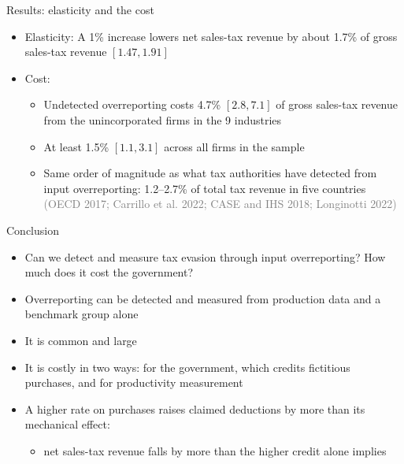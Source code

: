 \documentclass[
  ignorenonframetext,
  aspectratio=169,
]{beamer}
\providecommand{\tightlist}{%
  \setlength{\itemsep}{0pt}\setlength{\parskip}{0pt}}
\newcommand{\sm}[1]{\textcolor{gray}{\footnotesize #1}} %
\begin{document}
\begin{frame}{Results: elasticity and the cost}
\protect{}\label{results-elasticity-and-the-cost}
\begin{itemize}
\tightlist
\item
  Elasticity: A 1\% increase lowers net sales-tax revenue by about 1.7\%
  of gross sales-tax revenue \([1.47, 1.91]\)
\item
  Cost:

  \begin{itemize}
  \tightlist
  \item
    Undetected overreporting costs 4.7\% \([2.8, 7.1]\) of gross
    sales-tax revenue from the unincorporated firms in the 9 industries
  \item
    At least 1.5\% \([1.1, 3.1]\) across all firms in the sample
  \item
    Same order of magnitude as what tax authorities have detected from
    input overreporting: 1.2--2.7\% of total tax revenue in five
    countries \sm{(OECD 2017; Carrillo et al. 2022; CASE and IHS 2018;
    Longinotti 2022)}
  \end{itemize}
\end{itemize}
\end{frame}

\begin{frame}{Conclusion}
\protect{}\label{conclusion}
\begin{itemize}
\tightlist
\item
  Can we detect and measure tax evasion through input overreporting? How
  much does it cost the government?
\item
  Overreporting can be detected and measured from production data and a
  benchmark group alone
\item
  It is common and large
\item
  It is costly in two ways: for the government, which credits fictitious
  purchases, and for productivity measurement
\item
  A higher rate on purchases raises claimed deductions by more than its
  mechanical effect:

  \begin{itemize}
  \tightlist
  \item
    net sales-tax revenue falls by more than the higher credit alone
    implies
  \end{itemize}
\end{itemize}
\end{frame}
\end{document}
